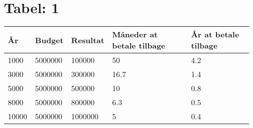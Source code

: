 \chapter{Tabel: 1}
\label{tab:Penge}
\begin{tabularx}{0.75\textwidth}{|X|X|X|X|X|}
\hline
År & Budget & Resultat & Måneder at betale tilbage & År at betale tilbage \\ \hline \hline
1000 & 5000000 & 100000 & 50 & 4.2 \\ \hline
3000 & 5000000 & 300000 & 16.7 & 1.4 \\ \hline
5000 & 5000000 & 500000 & 10 & 0.8 \\ \hline
8000 & 5000000 & 800000 & 6.3 & 0.5 \\ \hline
10000 & 5000000 & 1000000 & 5 & 0.4 \\ \hline
\end{tabularx}
